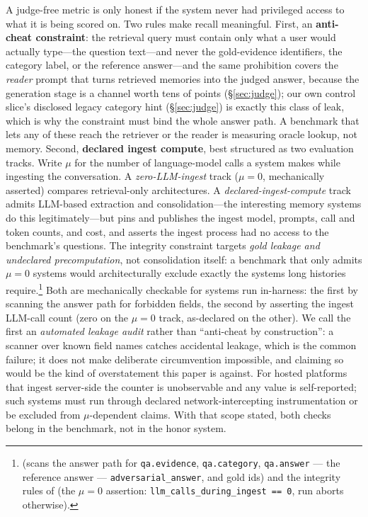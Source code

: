 \documentclass[11pt]{article}
\begin{document}
A judge-free metric is only honest if the system never had privileged access to what it is being scored on. Two rules make recall meaningful. First, an \textbf{anti-cheat constraint}: the retrieval query must contain only what a user would actually type---the question text---and never the gold-evidence identifiers, the category label, or the reference answer---and the same prohibition covers the \emph{reader} prompt that turns retrieved memories into the judged answer, because the generation stage is a channel worth tens of points (\S\ref{sec:judge}); our own control slice's disclosed legacy category hint (\S\ref{sec:judge}) is exactly this class of leak, which is why the constraint must bind the whole answer path. A benchmark that lets any of these reach the retriever or the reader is measuring oracle lookup, not memory. Second, \textbf{declared ingest compute}, best structured as two evaluation tracks. Write $\mu$ for the number of language-model calls a system makes while ingesting the conversation. A \emph{zero-LLM-ingest} track ($\mu = 0$, mechanically asserted) compares retrieval-only architectures. A \emph{declared-ingest-compute} track admits LLM-based extraction and consolidation---the interesting memory systems do this legitimately---but pins and publishes the ingest model, prompts, call and token counts, and cost, and asserts the ingest process had no access to the benchmark's questions. The integrity constraint targets \emph{gold leakage and undeclared precomputation}, not consolidation itself: a benchmark that only admits $\mu=0$ systems would architecturally exclude exactly the systems long histories require.\footnote{ (scans the answer path for \texttt{qa.evidence}, \texttt{qa.category}, \texttt{qa.answer} --- the reference answer --- \texttt{adversarial\_answer}, and gold ids) and the integrity rules of  (the $\mu = 0$ assertion: \texttt{llm\_calls\_during\_ingest == 0}, run aborts otherwise).} Both are mechanically checkable for systems run in-harness: the first by scanning the answer path for forbidden fields, the second by asserting the ingest LLM-call count (zero on the $\mu=0$ track, as-declared on the other). We call the first an \emph{automated leakage audit} rather than ``anti-cheat by construction'': a scanner over known field names catches accidental leakage, which is the common failure; it does not make deliberate circumvention impossible, and claiming so would be the kind of overstatement this paper is against. For hosted platforms that ingest server-side the counter is unobservable and any value is self-reported; such systems must run through declared network-intercepting instrumentation or be excluded from $\mu$-dependent claims. With that scope stated, both checks belong in the benchmark, not in the honor system.
\end{document}

